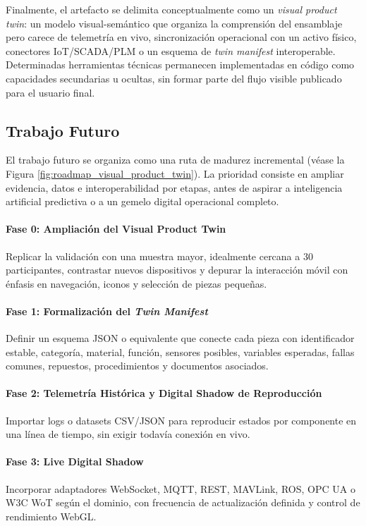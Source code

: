 Finalmente, el artefacto se delimita conceptualmente como un \textit{visual product twin}: un modelo visual-semántico que organiza la comprensión del ensamblaje pero carece de telemetría en vivo, sincronización operacional con un activo físico, conectores IoT/SCADA/PLM o un esquema de \textit{twin manifest} interoperable. Determinadas herramientas técnicas permanecen implementadas en código como capacidades secundarias u ocultas, sin formar parte del flujo visible publicado para el usuario final.

\subsection{Trabajo Futuro}

El trabajo futuro se organiza como una ruta de madurez incremental (véase la Figura \ref{fig:roadmap_visual_product_twin}). La prioridad consiste en ampliar evidencia, datos e interoperabilidad por etapas, antes de aspirar a inteligencia artificial predictiva o a un gemelo digital operacional completo.

\paragraph{Fase 0: Ampliación del Visual Product Twin} Replicar la validación con una muestra mayor, idealmente cercana a 30 participantes, contrastar nuevos dispositivos y depurar la interacción móvil con énfasis en navegación, iconos y selección de piezas pequeñas.

\paragraph{Fase 1: Formalización del \textit{Twin Manifest}} Definir un esquema JSON o equivalente que conecte cada pieza con identificador estable, categoría, material, función, sensores posibles, variables esperadas, fallas comunes, repuestos, procedimientos y documentos asociados.

\paragraph{Fase 2: Telemetría Histórica y Digital Shadow de Reproducción} Importar logs o datasets CSV/JSON para reproducir estados por componente en una línea de tiempo, sin exigir todavía conexión en vivo.

\paragraph{Fase 3: Live Digital Shadow} Incorporar adaptadores WebSocket, MQTT, REST, MAVLink, ROS, OPC UA o W3C WoT según el dominio, con frecuencia de actualización definida y control de rendimiento WebGL.

